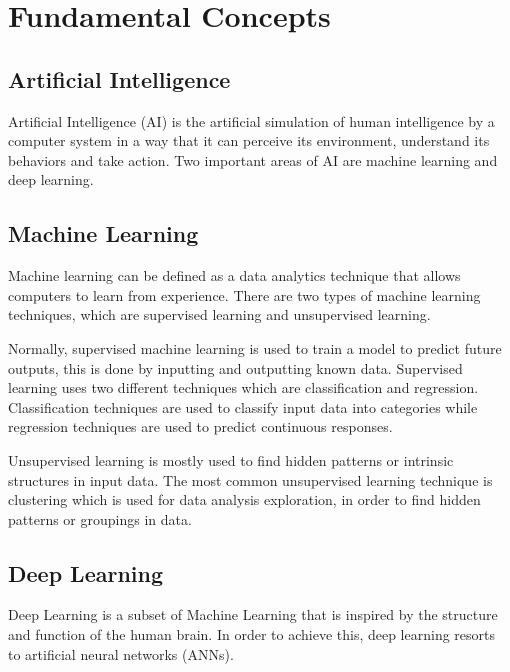 \newpage


\section{Fundamental Concepts}
    \subsection{Artificial Intelligence}
    \par Artificial Intelligence (AI) is the artificial simulation of human intelligence by a computer system in a way that it can perceive its environment, understand its behaviors and take action. Two important areas of AI are machine learning and deep learning. \cite{mathworks_AI}

    \subsection{Machine Learning}



    \par Machine learning can be defined as a data analytics technique that allows computers to learn from experience. There are two types of machine learning techniques, which are supervised learning and unsupervised learning.
    \par Normally, supervised machine learning is used to train a model to predict future outputs, this is done by inputting and outputting known data. Supervised learning uses two different techniques which are classification and regression. Classification techniques are used to classify input data into categories while regression techniques are used to predict continuous responses. 
    \par Unsupervised learning is mostly used to find hidden patterns or intrinsic structures in input data. The most common unsupervised learning technique is clustering which is used for data analysis exploration, in order to find hidden patterns or groupings in data. \cite{mathworks_NN}

    \subsection{Deep Learning}


    \par Deep Learning is a subset of Machine Learning that is inspired by the structure and function of the human brain. In order to achieve this, deep learning resorts to artificial neural networks (ANNs).
    
